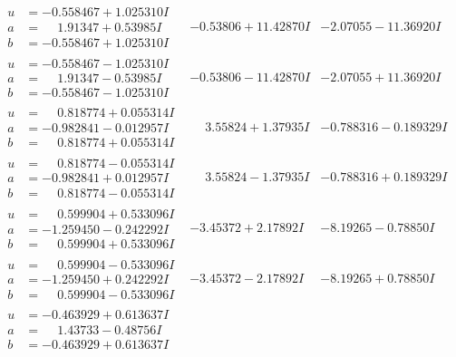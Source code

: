 \documentclass[1p]{elsarticle_modified}
\theoremstyle{definition}
\begin{document}
$$\begin{array}{c|c|c}
\begin{aligned}
u &= -0.558467 + 1.025310 I \\
a &= \phantom{-}1.91347 + 0.53985 I \\
b &= -0.558467 + 1.025310 I\end{aligned}
 & -0.53806 + 11.42870 I & -2.07055 - 11.36920 I \\ \hline\begin{aligned}
u &= -0.558467 - 1.025310 I \\
a &= \phantom{-}1.91347 - 0.53985 I \\
b &= -0.558467 - 1.025310 I\end{aligned}
 & -0.53806 - 11.42870 I & -2.07055 + 11.36920 I \\ \hline\begin{aligned}
u &= \phantom{-}0.818774 + 0.055314 I \\
a &= -0.982841 - 0.012957 I \\
b &= \phantom{-}0.818774 + 0.055314 I\end{aligned}
 & \phantom{-}3.55824 + 1.37935 I & -0.788316 - 0.189329 I \\ \hline\begin{aligned}
u &= \phantom{-}0.818774 - 0.055314 I \\
a &= -0.982841 + 0.012957 I \\
b &= \phantom{-}0.818774 - 0.055314 I\end{aligned}
 & \phantom{-}3.55824 - 1.37935 I & -0.788316 + 0.189329 I \\ \hline\begin{aligned}
u &= \phantom{-}0.599904 + 0.533096 I \\
a &= -1.259450 - 0.242292 I \\
b &= \phantom{-}0.599904 + 0.533096 I\end{aligned}
 & -3.45372 + 2.17892 I & -8.19265 - 0.78850 I \\ \hline\begin{aligned}
u &= \phantom{-}0.599904 - 0.533096 I \\
a &= -1.259450 + 0.242292 I \\
b &= \phantom{-}0.599904 - 0.533096 I\end{aligned}
 & -3.45372 - 2.17892 I & -8.19265 + 0.78850 I \\ \hline\begin{aligned}
u &= -0.463929 + 0.613637 I \\
a &= \phantom{-}1.43733 - 0.48756 I \\
b &= -0.463929 + 0.613637 I\end{aligned}

\end{array}$$
\end{document}

